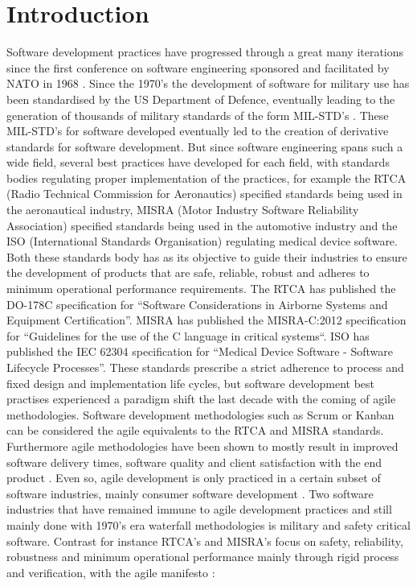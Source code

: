 \documentclass[conference]{IEEEtran}
\begin{document}
\section{Introduction}
Software development practices have progressed through a great many iterations since the first conference on software engineering sponsored and facilitated by NATO in 1968 \cite{Bauer_1968}. Since the 1970’s the development of software for military use has been standardised by the US Department of Defence, eventually leading to the generation of thousands of military standards of the form MIL-STD’s \cite{McDonald_2010}. These MIL-STD’s for software developed eventually led to the creation of derivative standards for software development. 
\break
\break
But since software engineering spans such a wide field, several best practices have developed for each field, with standards bodies regulating proper implementation of the practices, for example the RTCA (Radio Technical Commission for Aeronautics) specified standards being used in the aeronautical industry, MISRA (Motor Industry Software Reliability Association) specified standards being used in the automotive industry and the ISO (International Standards Organisation) regulating medical device software.  Both these standards body has as its objective to guide their industries to ensure the development of products that are safe, reliable, robust and adheres to minimum operational performance requirements.
\break
\break
The RTCA has published the DO-178C \cite{RTCA_2012} specification for “Software Considerations in Airborne Systems and Equipment Certification”. MISRA has published the MISRA-C:2012 \cite{MISRA_2012} specification for “Guidelines for the use of the C language in critical systems“. ISO has published the IEC 62304 \cite{Jordan_2006} specification for “Medical Device Software - Software Lifecycle Processes”.
\break
\break
These standards prescribe a strict adherence to process and fixed design and implementation life cycles, but software development best practises experienced a paradigm shift the last decade with the coming of agile methodologies. Software development methodologies such as Scrum or Kanban can be considered the agile equivalents to the RTCA and MISRA standards. Furthermore agile methodologies have been shown to mostly result in improved software delivery times, software quality and client satisfaction with the end product \cite{Armbrust_2011}.
\break
\break
Even so, agile development is only practiced in a certain subset of software industries, mainly consumer software development \cite{Diebold_2014}. Two software industries that have remained immune to agile development practices and still mainly done with 1970’s era waterfall methodologies is military and safety critical software. Contrast for instance RTCA’s and MISRA’s focus on safety, reliability, robustness and minimum operational performance mainly through rigid process and verification, with the agile manifesto \cite{Beck_2001}:
\end{document}
